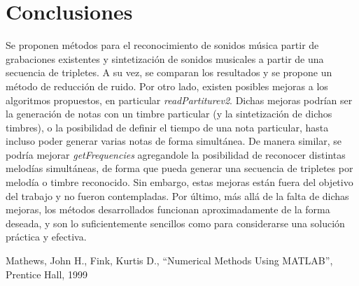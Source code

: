 \documentclass[journal, monochrome]{IEEEtran}
\begin{document}
\vspace{1cm}
\section{Conclusiones}
\label{section:conclusions}
\vspace{0.5cm}

Se proponen métodos para el reconocimiento de sonidos música partir de grabaciones existentes y sintetización de sonidos musicales a partir de una secuencia de tripletes. A su vez, se comparan los resultados y se propone un método de reducción de ruido. Por otro lado, existen posibles mejoras a los algoritmos propuestos, en particular \emph{readPartiturev2}. Dichas mejoras podrían ser la generación de notas con un timbre particular (y la sintetización de dichos timbres), o la posibilidad de definir el tiempo de una nota particular, hasta incluso poder generar varias notas de forma simultánea. De manera similar, se podría mejorar \emph{getFrequencies} agregandole la posibilidad de reconocer distintas melodías simultáneas, de forma que pueda generar una secuencia de tripletes por melodía o timbre reconocido. Sin embargo, estas mejoras están fuera del objetivo del trabajo y no fueron contempladas. Por último, más allá de la falta de dichas mejoras, los métodos desarrollados funcionan aproximadamente de la forma deseada, y son lo suficientemente sencillos como para considerarse una solución práctica y efectiva.


\vspace{1cm}
\begin{thebibliography}{1}
	Mathews, John H.,
	Fink, Kurtis D.,
	``Numerical Methods Using MATLAB'',
	Prentice Hall,
	1999
	
\end{thebibliography}





\begin{figure}
	
\end{figure}
\begin{figure}
	
\end{figure}
\begin{figure}
	
\end{figure}
\begin{figure}
	
\end{figure}
\end{document}
